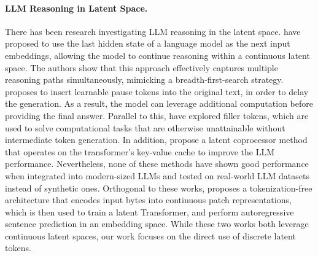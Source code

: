 \paragraph{LLM Reasoning in Latent Space.}
There has been research investigating LLM reasoning in the latent space. \citet{hao2024training} have proposed to use the last hidden state of a language model as the next input embeddings, allowing the model to continue reasoning within a continuous latent space. The authors show that this approach effectively captures multiple reasoning paths simultaneously, mimicking a breadth-first-search strategy. \citet{goyal2023think} proposes to insert learnable pause tokens into the original text, in order to delay the generation. As a result, the model can leverage additional computation before providing the final answer. Parallel to this, \citet{pfau2024let} have explored filler tokens, which are used to solve computational tasks that are otherwise unattainable without intermediate token generation. 
In addition, \citet{kvcache} propose a latent coprocessor method that operates on the transformer's key-value cache to improve the LLM performance.  
Nevertheless, none of these methods have shown good performance when integrated into modern-sized LLMs and tested on real-world LLM datasets instead of synthetic ones.
Orthogonal to these works, \citet{pagnoni2024bytelatenttransformerpatches} proposes a tokenization-free architecture that encodes input bytes into continuous patch representations, which is then used to train a latent Transformer, and \citet{barrault2024large} perform autoregressive sentence prediction in an embedding space. While these two works both leverage continuous latent spaces, our work focuses on the direct use of discrete latent tokens.

